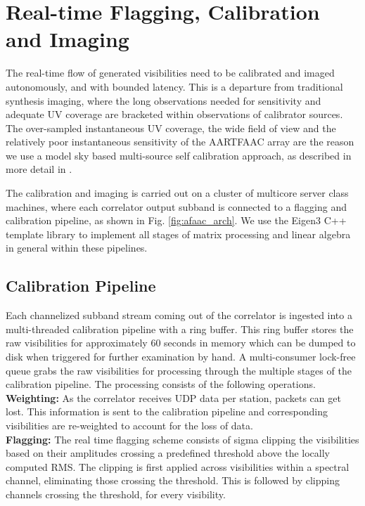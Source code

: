 \documentclass{ws-jai}
\begin{document}
\section {\label{sec:calim} Real-time Flagging, Calibration and Imaging}
The real-time  flow of generated visibilities  need to be calibrated  and imaged
autonomously, and  with bounded latency.   This is a departure  from traditional
synthesis  imaging,  where the  long  observations  needed for  sensitivity  and
adequate   UV  coverage   are  bracketed   within  observations   of  calibrator
sources. The over-sampled instantaneous UV coverage,  the wide field of view and
the  relatively poor  instantaneous sensitivity  of the  AARTFAAC array  are the
reason  we use  a model  sky based  multi-source self  calibration approach,  as
described in more detail in \cite {prasad2014real}.

The calibration  and imaging  is carried  out on a  cluster of  multicore server
class machines, where each correlator output  subband is connected to a flagging
and calibration  pipeline, as  shown in Fig.   \ref{fig:afaac_arch}. We  use the
Eigen3 \citep{eigenweb} C++  template library to implement all  stages of matrix
processing and linear algebra in general within these pipelines.\\

\subsection{Calibration Pipeline}
Each channelized subband stream coming out  of the correlator is ingested into a
multi-threaded calibration pipeline with a ring buffer.  This ring buffer stores
the  raw visibilities  for approximately  $60$ seconds  in memory  which can  be
dumped to disk when triggered for  further examination by hand. A multi-consumer
lock-free queue grabs  the raw visibilities for processing  through the multiple
stages of  the calibration  pipeline. The processing  consists of  the following
operations.\\

\noindent \textbf {Weighting:} As the  correlator receives UDP data per station,
packets can get  lost. This information is sent to  the calibration pipeline and
corresponding visibilities are re-weighted to account for the loss of data. \\

\noindent \textbf  {Flagging:} The real  time flagging scheme consists  of sigma
clipping  the  visibilities based  on  their  amplitudes crossing  a  predefined
threshold above the  locally computed RMS. The clipping is  first applied across
visibilities  within   a  spectral  channel,  eliminating   those  crossing  the
threshold. This  is followed  by clipping channels  crossing the  threshold, for
every visibility.\\
\end{document}
